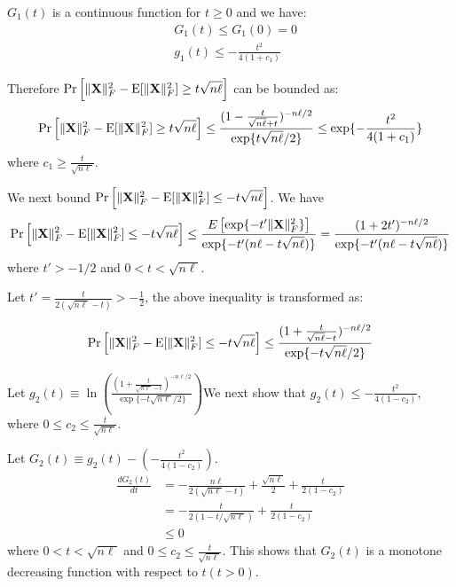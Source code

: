 $G_1(t)$ is a continuous function for $t\geq 0$ and we have:
\begin{equation}
\begin{split}
    &G_1(t) \leq G_1(0) = 0 \\
    & g_1(t) \leq -\frac{t^2}{4(1+c_1)}
\end{split}
\end{equation}

Therefore $\Pr\left[ \|\mathbf{X}\|^2_F - \mathrm{E}[\|\mathbf{X}\|^2_F] \geq t \sqrt{n\ell} \right]$ can be bounded as:
\begin{equation}
\begin{split}
     \Pr\left[ \|\mathbf{X}\|^2_F - \mathrm{E}[\|\mathbf{X}\|^2_F] \geq t \sqrt{n\ell} \right] 
     \leq \frac{(1-\frac{t}{\sqrt{n\ell}+t})^{-n\ell/2}}{\exp \{t\sqrt{n\ell}/2\}} 
     \leq \exp\{-\frac{t^2}{4(1+c_1)}\}
\end{split}
\end{equation}
where $c_1 \geq \frac{t}{\sqrt{n\ell}}$.



We next bound $\Pr\left[ \|\mathbf{X}\|^2_F - \mathrm{E}[\|\mathbf{X}\|^2_F] \leq -t \sqrt{n\ell} \right]$. We have
\begin{equation}
     \Pr\left[ \|\mathbf{X}\|^2_F - \mathrm{E}[\|\mathbf{X}\|^2_F] \leq -t \sqrt{n\ell} \right] 
     \leq \frac{E\left[\exp \{-t'\|\mathbf{X}\|^2_F\} \right]}{\exp \{-t' (n\ell - t \sqrt{n\ell})\}} 
     = \frac{(1+2t')^{-n\ell/2}}{\exp \{-t' (n\ell - t \sqrt{n\ell})\}}
\end{equation}
where $t' > -1/2$ and $0<t<\sqrt{n\ell}$. 

Let $t' = \frac{t}{2(\sqrt{n\ell}-t)} > -\frac{1}{2}$, the above inequality is transformed as:

\begin{equation}
\begin{split}
     \Pr\left[ \|\mathbf{X}\|^2_F - \mathrm{E}[\|\mathbf{X}\|^2_F] \leq -t \sqrt{n\ell} \right] 
     \leq \frac{(1+\frac{t}{\sqrt{n\ell}-t})^{-n\ell/2}}{\exp \{-t\sqrt{n\ell}/2\}} 
\end{split}
\end{equation}

Let $g_2(t)\equiv \ln \left( \frac{(1+\frac{t}{\sqrt{n\ell}-t})^{-n\ell/2}}{\exp \{-t\sqrt{n\ell}/2\}}  \right)$We next show that $g_2(t) \leq -\frac{t^2}{4(1-c_2)}$, where $0 \leq c_2 \leq \frac{t}{\sqrt{n\ell}}$.

Let $G_2(t) \equiv g_2(t) - \left( -\frac{t^2}{4(1-c_2)}\right)$.
\begin{equation}
\begin{split}
    \frac{dG_2(t)}{dt} 
    &= -\frac{n\ell}{2(\sqrt{n\ell}-t)} + \frac{\sqrt{n\ell}}{2}+\frac{t}{2(1-c_2)} \\
    &= -\frac{t}{2(1-t/\sqrt{n\ell})} + \frac{t}{2(1-c_2)} \\
    & \leq 0
\end{split}
\end{equation}
where $0<t<\sqrt{n\ell}$ and $0 \leq c_2 \leq \frac{t}{\sqrt{n\ell}}$. This shows that $G_2(t)$ is a monotone decreasing function with respect to $t$$(t>0)$.


